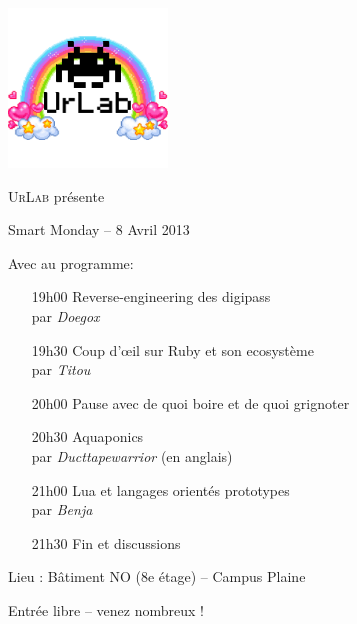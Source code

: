 \documentclass[a4paper]{article}
\newcommand{\qui}{\\par \emph}
\begin{document}
\parindent0pt
\begin{center}
\includegraphics{urlab}

 \Huge\textsc{UrLab} présente

Smart Monday -- 8 Avril 2013
\end{center}

\LARGE Avec au programme:

\begin{itemize}
\item[19h00] Reverse-engineering des digipass \qui{Doegox}
\item[19h30] Coup d'\oe il sur Ruby et son ecosystème \qui{Titou}
\item[20h00] Pause avec de quoi boire et de quoi grignoter
\item[20h30] Aquaponics \qui{Ducttapewarrior} (en anglais)
\item[21h00] Lua et langages orientés prototypes \qui{Benja}
\item[21h30] Fin et discussions 
\end{itemize}

Lieu : Bâtiment NO (8e étage) -- Campus Plaine 

\vfill

\begin{raggedleft}
Entrée libre -- venez nombreux !\par
\end{raggedleft}
\end{document}
